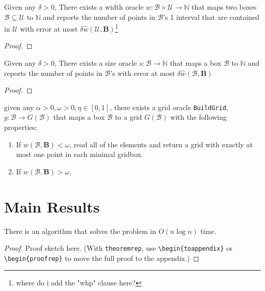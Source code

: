 \documentclass[11pt]{article}
\theoremstyle{definition}
\theoremstyle{remark}
\newcommand{\N}{\mathbb{N}}
\newcommand{\B}{\mathcal{B}}
\newcommand{\U}{\mathcal{U}}
\begin{document}
\begin{theoremrep}\label{thm:width oracle}
  Given any \(\delta>0\), There exists a width oracle \(w:\B\times \U \to \N\) that maps two boxes \(\B\subseteq \U\) to \(\N\) and reports the number of points in \(\B\)'s 1 interval that are contained in \(\U\) with error at most \(\delta \hat w(\U,\bm B)\)\footnote{where do i add the "whp" clause here?}
\end{theoremrep}
\begin{proof}
\end{proof}

\begin{theoremrep}\label{thm:size oracle}
  Given any \(\delta>0\), There exists a size oracle \(s:\B \to \N\) that maps a box \(\B\) to \(\N\) and reports the number of points in \(\B\)'s with error at most \(\delta \hat w(\B,\bm B)\)

\end{theoremrep}
\begin{proof}

\end{proof}

\begin{theoremrep}\label{thm:grid oracle}
  given any \(\alpha>0,\omega>0,\eta\in [0,1]\), there exists a grid oracle \texttt{BuildGrid}, \(g:\B\to G(\B)\) that maps a box \(\B\) to a grid \(G(\B)\) with the following properties:
  \begin{enumerate}
    \item If \(w(\B,\bm B)<\omega\), read all of the elements and return a grid with exactly at most one point in each minimal gridbox.
    \item If \(w(\B,\bm B)>\omega\),
  \end{enumerate}
\end{theoremrep}

\section{Main Results}\label{sec:method}

\begin{theorem}\label{thm:main}
  There is an algorithm that solves the problem in $O(n \log n)$ time.
\end{theorem}
\begin{proof}
  Proof sketch here. (With \texttt{theoremrep}, use \texttt{\textbackslash begin\{toappendix\}}
  or \texttt{\textbackslash begin\{proofrep\}} to move the full proof to the appendix.)
\end{proof}
\end{document}
